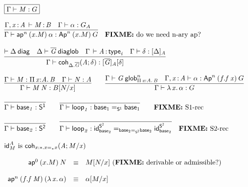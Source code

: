 \begin{small}
\[
\begin{array}{l}
\framebox{\ofglob{\Gamma}{M}{G}} \\ \\

\infer{\ofglob{\Gamma}{\apn{n}{(x.M)}{\alpha}}{\Apn{n}{(x.M)}{G}}}
      {\oftp{\Gamma,\tptm{x}{A}}{M}{B} &
       \ofglob{\Gamma}{\alpha}{G_A} &
      }
\quad
\text{\FIXME{do we need n-ary ap?}}
\\ \\

\infer{\ofglob{\Gamma}{\coh{\ctx{\Delta}.\diag{G}}{A}{\delta}}{\tsubst{\interpdiag{\diag{G}}{A}}{\delta}}}
      {\wfdiag{\Delta} &
       \wfdiaglob{\Delta}{\diag G} & %
       \oftp{\Gamma}{A}{\typ{i}} &
       \wfsub{\Gamma}{\delta}{\interpdiag{\Delta}{A}}
      }
\\ \\

\infer{\ofglob{\Gamma}{\app{M}{N}}{\subst{B}{N}{x}}}
      {\ofglob{\Gamma}{M}{\picl{x}{A}{B}} &
        \ofglob{\Gamma}{N}{A}}
\qquad
\infer{\ofglob{\Gamma}{\ulam{x}{\alpha}}{G}}
      {\wfglob{\Gamma}{G}{n}{\picl{x}{A}{B}} &
       \ofglob{\Gamma,\tptm{x}{A}}{\alpha}{\Apn{n}{(f.\app{f}{x})}{G}}}
\\ \\

\infer{\ofglob{\Gamma}{\base{1}}{\dsd{S^1}}}{}
\qquad
\infer{\ofglob{\Gamma}{\lp{1}}{\homj{\dsd{S^1}}{\base{1}}{\base{1}}}}
      {}
\qquad
\text{\FIXME{S1-rec}}
\\ \\
\infer{\ofglob{\Gamma}{\base{2}}{\dsd{S^2}}}{}
\qquad
\infer{\ofglob{\Gamma}{\lp{2}}{\homj{\homj{\dsd{S^2}}{\base{2}}{\base{2}}}{\idt{\dsd{S^2}}{\base{2}}}{\idt{\dsd{S^2}}{\base{2}}}}}
      {} 
\quad
\text{\FIXME{S2-rec}}
\\ \\
\text{\idt{A}{M} is \coh{x:\diagbase.\homj{\diagbase}{x}{x}}{A}{M/x}} 

\\ \\
\begin{array}{rcl}
\apn{0}{(x.M)}{N} & \equiv & \subst{M}{N}{x} \text{ (\FIXME{derivable or admissible?})} \\ \\

\apn{n}{(f.\app f M)}{(\ulam{x}{\alpha})} & \equiv & \tsubst{\alpha}{M/x} \\


\end{array}
\end{array}\]
\end{small}
